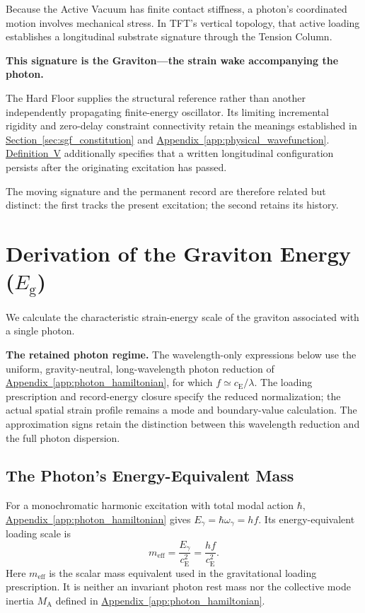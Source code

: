 Because the Active Vacuum has finite contact stiffness, a photon's coordinated motion involves mechanical stress. In TFT's vertical topology, that active loading establishes a longitudinal substrate signature through the Tension Column.

\noindent\textbf{This signature is the Graviton---the strain wake accompanying the photon.}

The Hard Floor supplies the structural reference rather than another independently propagating finite-energy oscillator. Its limiting incremental rigidity and zero-delay constraint connectivity retain the meanings established in \hyperref[sec:sgf_constitution]{Section~\ref*{sec:sgf_constitution}} and \hyperref[app:physical_wavefunction]{Appendix~\ref*{app:physical_wavefunction}}. \hyperref[def:definition_five]{Definition~V} additionally specifies that a written longitudinal configuration persists after the originating excitation has passed.

The moving signature and the permanent record are therefore related but distinct: the first tracks the present excitation; the second retains its history.

\section[Derivation of the Graviton Energy (Eg)]{Derivation of the Graviton Energy ($E_{\mathrm g}$)}
\label{sec:AC_graviton_energy}

We calculate the characteristic strain-energy scale of the graviton associated with a single photon.

\noindent\textbf{The retained photon regime.}
The wavelength-only expressions below use the uniform, gravity-neutral, long-wavelength photon reduction of \hyperref[app:photon_hamiltonian]{Appendix~\ref*{app:photon_hamiltonian}}, for which $f\simeq c_{\mathrm E}/\lambda$. The loading prescription and record-energy closure specify the reduced normalization; the actual spatial strain profile remains a mode and boundary-value calculation. The approximation signs retain the distinction between this wavelength reduction and the full photon dispersion.

\subsection{The Photon's Energy-Equivalent Mass}

For a monochromatic harmonic excitation with total modal action $\hbar$, \hyperref[app:photon_hamiltonian]{Appendix~\ref*{app:photon_hamiltonian}} gives $E_\gamma=\hbar\omega_\gamma=hf$. Its energy-equivalent loading scale is
\begin{equation}
    m_{\mathrm{eff}}
    =\frac{E_\gamma}{c_{\mathrm E}^{2}}
    =\frac{hf}{c_{\mathrm E}^{2}}.
    \label{eq:AC_effective_mass}
\end{equation}
Here $m_{\mathrm{eff}}$ is the scalar mass equivalent used in the gravitational loading prescription. It is neither an invariant photon rest mass nor the collective mode inertia $M_{\mathrm A}$ defined in \hyperref[app:photon_hamiltonian]{Appendix~\ref*{app:photon_hamiltonian}}.

